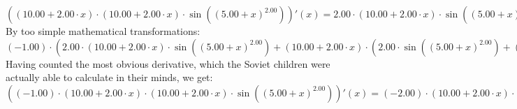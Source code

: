 \documentclass{article}
\begin{document}
$({\left({{10.00} + {{2.00} \cdot {x}}}\right) \cdot {\left({{10.00} + {{2.00} \cdot {x}}}\right) \cdot  \sin {\left({\left({{5.00} + {x}}\right) ^ {2.00}}\right)} }})'(x) = {{{2.00} \cdot {\left({{10.00} + {{2.00} \cdot {x}}}\right) \cdot  \sin {\left({\left({{5.00} + {x}}\right) ^ {2.00}}\right)} }} + {\left({{10.00} + {{2.00} \cdot {x}}}\right) \cdot \left({{{2.00} \cdot  \sin {\left({\left({{5.00} + {x}}\right) ^ {2.00}}\right)} } + {\left({{10.00} + {{2.00} \cdot {x}}}\right) \cdot { \cos {\left({\left({{5.00} + {x}}\right) ^ {2.00}}\right)}  \cdot \left({{10.00} + {{2.00} \cdot {x}}}\right)}}}\right)}}$\newline
\newline
By too simple mathematical transformations:
 ${\left({-1.00}\right) \cdot \left({{{2.00} \cdot {\left({{10.00} + {{2.00} \cdot {x}}}\right) \cdot  \sin {\left({\left({{5.00} + {x}}\right) ^ {2.00}}\right)} }} + {\left({{10.00} + {{2.00} \cdot {x}}}\right) \cdot \left({{{2.00} \cdot  \sin {\left({\left({{5.00} + {x}}\right) ^ {2.00}}\right)} } + {\left({{10.00} + {{2.00} \cdot {x}}}\right) \cdot { \cos {\left({\left({{5.00} + {x}}\right) ^ {2.00}}\right)}  \cdot \left({{10.00} + {{2.00} \cdot {x}}}\right)}}}\right)}}\right)} = {{\left({-2.00}\right) \cdot {\left({{10.00} + {{2.00} \cdot {x}}}\right) \cdot  \sin {\left({\left({{5.00} + {x}}\right) ^ {2.00}}\right)} }} - {\left({{10.00} + {{2.00} \cdot {x}}}\right) \cdot \left({{{2.00} \cdot  \sin {\left({\left({{5.00} + {x}}\right) ^ {2.00}}\right)} } + {\left({{10.00} + {{2.00} \cdot {x}}}\right) \cdot { \cos {\left({\left({{5.00} + {x}}\right) ^ {2.00}}\right)}  \cdot \left({{10.00} + {{2.00} \cdot {x}}}\right)}}}\right)}}$ 
 \newline
 \newline 
Having counted the most obvious derivative, which the Soviet children were actually able to calculate in their minds, we get:
$({\left({-1.00}\right) \cdot {\left({{10.00} + {{2.00} \cdot {x}}}\right) \cdot {\left({{10.00} + {{2.00} \cdot {x}}}\right) \cdot  \sin {\left({\left({{5.00} + {x}}\right) ^ {2.00}}\right)} }}})'(x) = {{\left({-2.00}\right) \cdot {\left({{10.00} + {{2.00} \cdot {x}}}\right) \cdot  \sin {\left({\left({{5.00} + {x}}\right) ^ {2.00}}\right)} }} - {\left({{10.00} + {{2.00} \cdot {x}}}\right) \cdot \left({{{2.00} \cdot  \sin {\left({\left({{5.00} + {x}}\right) ^ {2.00}}\right)} } + {\left({{10.00} + {{2.00} \cdot {x}}}\right) \cdot { \cos {\left({\left({{5.00} + {x}}\right) ^ {2.00}}\right)}  \cdot \left({{10.00} + {{2.00} \cdot {x}}}\right)}}}\right)}}$\newline
\end{document}
